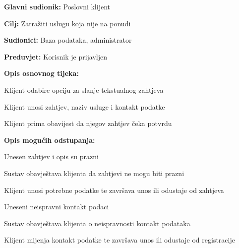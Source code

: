 				\noindent {}
				\begin{packed_item}
					
					\item \textbf{Glavni sudionik: } Poslovni klijent
					\item  \textbf{Cilj:}  Zatražiti uslugu koja nije na ponudi
					\item  \textbf{Sudionici:} Baza podataka, administrator
					\item  \textbf{Preduvjet:} Korisnik je prijavljen
					\item  \textbf{Opis osnovnog tijeka:}
					
					\item[] \begin{packed_enum}
						
						\item Klijent odabire opciju za slanje tekstualnog zahtjeva
						\item Klijent unosi zahtjev, naziv usluge i kontakt podatke
						\item Klijent prima obavijest da njegov zahtjev čeka potvrdu
					
					\end{packed_enum}
					
					\item  \textbf{Opis mogućih odstupanja:}
					
					\item[] \begin{packed_item}
						
						\item[2.a]  Unesen zahtjev i opis su prazni
						\item[] \begin{packed_enum}
							
							\item Sustav obavještava klijenta da zahtjevi ne mogu biti prazni
							\item  Klijent unosi potrebne podatke te završava unos ili odustaje od zahtjeva
							
						\end{packed_enum}
					
						\item[2.b]  Uneseni neispravni kontakt podaci
						\item[] \begin{packed_enum}
							
							\item Sustav obavještava klijenta o neispravnosti kontakt podataka
							\item  Klijent mijenja kontakt podatke te završava unos ili odustaje od registracije
							
						\end{packed_enum}
					\end{packed_item}
				\end{packed_item}
			
